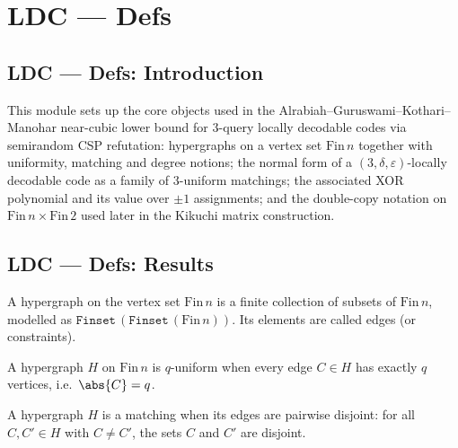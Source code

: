 \section{LDC --- Defs}
\subsection*{LDC --- Defs: Introduction}

This module sets up the core objects used in the Alrabiah--Guruswami--Kothari--Manohar
near-cubic lower bound for $3$-query locally decodable codes via semirandom CSP
refutation: hypergraphs on a vertex set $\mathrm{Fin}\,n$ together with uniformity,
matching and degree notions; the normal form of a $(3,\delta,\varepsilon)$-locally
decodable code as a family of $3$-uniform matchings; the associated XOR polynomial and
its value over $\pm 1$ assignments; and the double-copy notation on $\mathrm{Fin}\,n
\times \mathrm{Fin}\,2$ used later in the Kikuchi matrix construction.

\subsection*{LDC --- Defs: Results}

\begin{definition}
\label{Hypergraph}
\leanok
{}
A hypergraph on the vertex set $\mathrm{Fin}\,n$ is a finite collection of subsets of
$\mathrm{Fin}\,n$, modelled as $\mathtt{Finset}\,(\mathtt{Finset}\,(\mathrm{Fin}\,n))$.
Its elements are called edges (or constraints).
\end{definition}

\begin{definition}
\label{Hypergraph.IsUniform}
\leanok
{}
A hypergraph $H$ on $\mathrm{Fin}\,n$ is $q$-uniform when every edge $C \in H$ has
exactly $q$ vertices, i.e.\ $\abs{C} = q$.
\end{definition}

\begin{definition}[Matching]
\label{Hypergraph.IsMatching}
\leanok
{}
A hypergraph $H$ is a matching when its edges are pairwise disjoint: for all
$C, C' \in H$ with $C \neq C'$, the sets $C$ and $C'$ are disjoint.
\end{definition}

